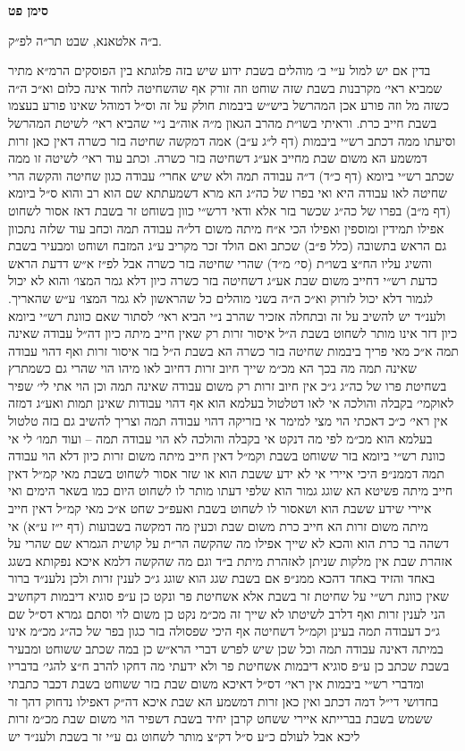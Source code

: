 \documentclass[12pt, openany]{book}
\newcommand{\chapname}{}
\newcommand{\newchap}[1]{
	\addcontentsline{toc}{chapter}{#1}
	\renewcommand{\chapname}{#1}
		\begin{center}
			\textbf{%
\fontsize{16pt}{16pt}\selectfont
				#1}
		\end{center}
}
\begin{document}
\newchap{סימן פט}
\begin{multicols}{2}
ב״ה אלטאנא, שבט תר״ה לפ״ק.\\\vspace{0pt}

בדין אם יש למול ע״י ב׳ מוהלים בשבת ידוע שיש בזה פלוגתא בין הפוסקים הרמ״א מתיר שמביא ראי׳ מקרבנות בשבת שזה שוחט וזה זורק אף שהשחיטה לחוד אינה כלום וא״כ ה״ה כשזה מל וזה פורע אכן המהרשל ביש״ש ביבמות חולק על זה וס״ל דמוהל שאינו פורע בעצמו בשבת חייב כרת. וראיתי בשו״ת מהרב הגאון מ״ה אוה״ב נ״י שהביא ראי׳ לשיטת המהרשל וסיעתו ממה דכתב רש״י ביבמות (דף ל״ג ע״ב) אמה דמקשה שחיטה בזר כשרה דאין כאן זרות דמשמע הא משום שבת מחייב אע״ג דשחיטה בזר כשרה. וכתב עוד ראי׳ לשיטה זו ממה שכתב רש״י ביומא (דף כ״ד) ד״ה עבודה תמה ולא שיש אחרי׳ עבודה כגון שחיטה והקשה הרי שחיטה לאו עבודה היא ואי בפרו של כה״ג הא מרא דשמעתתא שם הוא רב והוא ס״ל ביומא (דף מ״ב) בפרו של כה״ג שכשר בזר אלא ודאי דרש״י כוון בשוחט זר בשבת דאז אסור לשחוט אפילו תמידין ומוספין ואפילו הכי א״ח מיתה משום דל״ה עבודה תמה וכחב עוד שלזה נתכוון גם הראש בתשובה (כלל פ״ב) שכתב ואם הולד זכר מקריב ע״ג המזבח ושוחט ומבעיר בשבת והשיג עליו הח״צ בשו״ת (סי׳ מ״ד) שהרי שחיטה בזר כשרה אבל לפ״ז א״ש דדעת הראש כדעת רש״י דחייב משום שבת אע״ג דשחיטה בזר כשרה כיון דלא גמר המצו׳ והוא לא יכול לגמור דלא יכול לזרוק וא״כ ה״ה בשני מוהלים כל שהראשון לא גמר המצו׳ ע״ש שהאריך. ולענ״ד יש להשיב על זה ובתחלה אזכיר שהרב נ״י הביא ראי׳ לסתור שאם כוונת רש״י ביומא כיון דזר אינו מותר לשחוט בשבת ה״ל איסור זרות רק שאין חייב מיתה כיון דה״ל עבודה שאינה תמה א״כ מאי פריך ביבמות שחיטה בזר כשרה הא בשבת ה״ל בזר איסור זרות ואף דהוי עבודה שאינה תמה מה בכך הא מכ״מ שייך חיוב זרות דחיוב לאו מיהו הוי שהרי גם כשמתרץ בשחיטת פרו של כה״ג ג״כ אין חיוב זרות רק משום עבודה שאינה תמה וכן הוי אתי לי׳ שפיר לאוקמי׳ בקבלה והולכה אי לאו דטלטול בעלמא הוא אף דהוי עבודות שאינן תמות ואע״ג דמזה אין ראי׳ כ״כ דאכתי הוי מצי למימר אי בזריקה דהוי עבודה תמה וצריך להשיב גם בזה טלטול בעלמא הוא מכ״מ לפי מה דנקט אי בקבלה והולכה לא הוי עבודה תמה – ועוד תמו׳ לי אי כוונת רש״י ביומא בזר ששוחט בשבת וקמ״ל דאין חייב מיתה משום זרות כיון דלא הוי עבודה תמה דממנ״פ היכי איירי אי לא ידע ששבת הוא או שזר אסור לשחוט בשבת מאי קמ״ל דאין חייב מיתה פשיטא הא שוגג גמור הוא שלפי דעתו מותר לו לשחוט היום כמו בשאר הימים ואי איירי שידע ששבת הוא ושאסור לו לשחוט בשבת ואעפ״כ שחט א״כ מאי קמ״ל דאין חייב מיתה משום זרות הא חייב כרת משום שבת וכעין מה דמקשה בשבועות (דף י״ז ע״א) אי דשהה בר כרת הוא והכא לא שייך אפילו מה שהקשה הר״ת על קושית הגמרא שם שהרי על אזהרת שבת אין מלקות שניתן לאזהרת מיתת ב״ד וגם מה שהקשה דלמא איכא נפקותא בשגג באחד והזיד באחד דהכא ממנ״פ אם בשבת שגג הוא שוגג ג״כ לענין זרות ולכן נלענ״ד ברור שאין כוונת רש״י על שחיטת זר בשבת אלא אשחיטת פר ונקט כן ע״פ סוגיא דיבמות דקחשיב הני לענין זרות ואף דלרב לשיטתו לא שייך זה מכ״מ נקט כן משום לוי וסתם גמרא דס״ל שם ג״כ דעבודה תמה בעינן וקמ״ל דשחיטה אף היכי שפסולה בזר כגון בפר של כה״ג מכ״מ אינו במיתה דאינה עבודה תמה וכל שכן שיש לפרש דברי הרא״ש כן במה שכתב ששוחט ומבעיר בשבת שכתב כן ע״פ סוגיא דיבמות אשחיטת פר ולא ידעתי מה דחקו להרב ח״צ להגי׳ בדבריו ומדברי רש״י ביבמות אין ראי׳ דס״ל דאיכא משום שבת בזר ששוחט בשבת דכבר כתבתי בחדושי די״ל דמה דכתב ואין כאן זרות דמשמע הא שבת איכא דה״ק דאפילו נדחוק דהך זר ששמש בשבת בברייתא איירי ששחט קרבן יחיד בשבת דשפיר הוי משום שבת מכ״מ זרות ליכא אבל לעולם כ״ע ס״ל דק״צ מותר לשחוט גם ע״י זר בשבת ולענ״ד יש 
\end{multicols}
\end{document}
